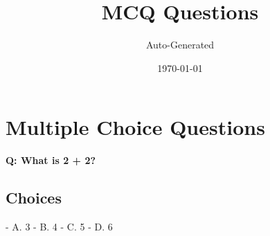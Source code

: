 \documentclass{article}%
\title{MCQ Questions}%
\author{Auto{-}Generated}%
\date{\today}%
\begin{document}
%
\normalsize%
\maketitle%
\section{Multiple Choice Questions}%
\label{sec:MultipleChoiceQuestions}%
\textbf{Q: What is 2 + 2?}%
\newline%
%
\subsection{Choices}%
\label{subsec:Choices}%
{-} A. 3\newline%
%
{-} B. 4\newline%
%
{-} C. 5\newline%
%
{-} D. 6\newline%

%
\end{document}

